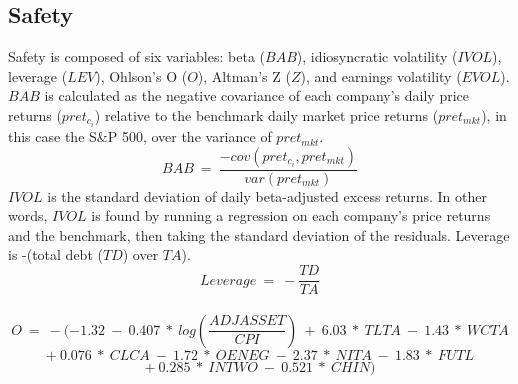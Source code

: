 \documentclass[12pt]{article}
\begin{document}
\subsection*{Safety}
Safety is composed of six variables: beta ($BAB$), idiosyncratic volatility ($IVOL$), leverage ($LEV$), Ohlson's O ($O$), Altman's Z ($Z$), and earnings volatility ($EVOL$). $BAB$ is calculated as the negative covariance of each company's daily price returns ($pret_{c_i}$) relative to the benchmark daily market price returns ($pret_{mkt}$), in this case the S\&P 500, over the variance of $pret_{mkt}$. $$BAB \ = \ \frac{-cov(pret_{c_i},pret_{mkt})}{var(pret_{mkt})}$$ $IVOL$ is the standard deviation of daily beta-adjusted excess returns. In other words, $IVOL$ is found by running a regression on each company's price returns and the benchmark, then taking the standard deviation of the residuals. Leverage is -(total debt ($TD$) over $TA$). $$Leverage \ = \ -\frac{TD}{TA}$$ 
\\
$$ O \ = \ -(-1.32 \ - \ 0.407 \ * \ log\left(\frac{ADJASSET}{CPI}\right) \ + \ 6.03 \ * \ TLTA \ - \ 1.43 \ * \ WCTA$$
$$ + \ 0.076 \ * \ CLCA \ - \ 1.72 \ * \ OENEG \ - \ 2.37 \ * \ NITA \ - \ 1.83 \ * \ FUTL$$
$$ + \ 0.285 \ * \ INTWO \ - \ 0.521 \ * \ CHIN)$$ 
\end{document}
